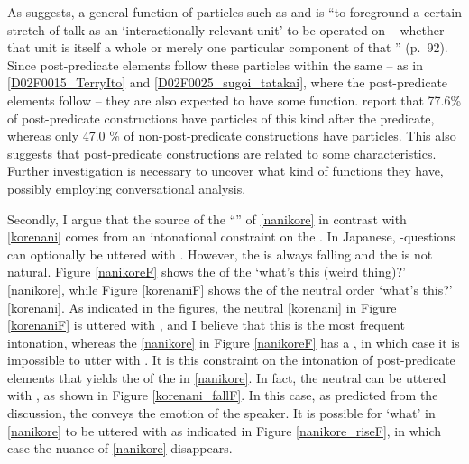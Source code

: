 As  suggests,
a general function of  particles such as  and  is ``to foreground a certain stretch of talk as an `interactionally relevant unit' to be operated on
-- whether that unit is itself a whole  or merely one particular component of that '' (p.~92).
Since post-predicate elements follow these  particles within the same  -- as in \ref{D02F0015_TerryIto} and \ref{D02F0025_sugoi_tatakai},
where the post-predicate elements follow  -- they are also expected to have some  function.
 report that
77.6\% of post-predicate constructions have  particles of this kind after the predicate,
whereas only 47.0 \% of non-post-predicate constructions have  particles.
This also suggests that post-predicate constructions are related to
some  characteristics.
Further investigation is necessary to uncover what kind of  functions they have, possibly employing conversational analysis.

Secondly, I argue that  the source of the ``''  of \ref{nanikore} in contrast with \ref{korenani} comes from an intonational constraint on the .
In Japanese, -questions can optionally be uttered with .
However, the  is always falling and the  is not natural.
Figure \ref{nanikoreF} shows the  of the   `what's this (weird thing)?' \ref{nanikore},
while Figure \ref{korenaniF} shows the  of the neutral order  `what's this?' \ref{korenani}.
As indicated in the figures, the neutral  \ref{korenani} in Figure \ref{korenaniF} is uttered with ,
and I believe that this is the most frequent intonation,
whereas the  \ref{nanikore} in Figure \ref{nanikoreF} has a ,
in which case it is impossible to utter  with .
It is this constraint on the intonation of post-predicate elements that yields the   of the  in \ref{nanikore}.
In fact, the neutral   can be uttered with , as shown in Figure \ref{korenani_fallF}.
In this case, as predicted from the discussion, the  conveys the emotion of the speaker.
It is possible for  `what' in \ref{nanikore} to be uttered with  as indicated in Figure \ref{nanikore_riseF},
in which case the  nuance of \ref{nanikore} disappears.


